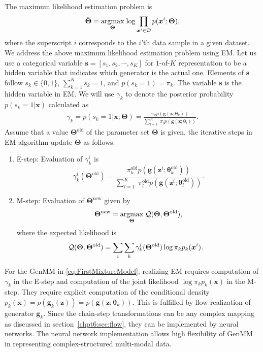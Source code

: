 The maximum likelihood estimation problem is
\begin{equation}\label{eq:max-genmm}
  \hat{\bm{\Theta}} = \underset{\bm{\Theta}}{\operatorname{argmax}}\;{\log{\prod_{\bm{x}^{i} \in \mathcal{D}} p(\bm{x}^{i};\bm{\Theta})}},
\end{equation}
where the superscript $i$ corresponds to the $i$'th data sample in a given dataset.
We address the above maximum likelihood estimation problem using EM. 
Let us use a categorical variable $\bm{s} = [s_1, s_2, \cdots, s_K]$
for $1$-of-$K$ representation to be a hidden variable that indicates which generator is the actual one. Elements of $\bm{s}$ follow $s_k \in \{0,1\}$, $\sum_{k=1}^K s_k =1$, and $p(s_k=1)=\pi_k$. The variable $\bm{s}$ is the hidden variable in EM. We will use $\gamma_k$ to denote the posterior probability $p(s_k =1|\bm{x})$ calculated as
\begin{align}\label{eq-genmm-gamma-org}
  \gamma_k = p(s_k =1|\bm{x};\bm{\Theta}) 
  = \frac{\pi_k p(\bm{g}(\bm{z};\bm{\theta}_k))}{\sum_{l=1}^K\; \pi_l p(\bm{g}(\bm{z};\bm{\theta}_l))}.
\end{align}
Assume that a value $\bm{\Theta}^{\mathrm{old}}$ of the parameter set $\bm{\Theta}$ is given, the iterative steps in EM algorithm update $\bm{\Theta}$ as follows.
\begin{enumerate}
\item E-step: Evaluation of $\gamma_{k}^{i}$ is 
  \begin{equation}\label{eq-genmm-e-step}
    \gamma_{k}^{i}(\bm{\Theta}^{\mathrm{old}}) = \frac{\pi_k^\mathrm{{old}} p(\bm{g}(\bm{z}^{i};\bm{\theta}_k^{\mathrm{old}}))}{\sum_{l=1}^K\; \pi_l^\mathrm{{old}} p(\bm{g}(\bm{z}^{i};\bm{\theta}_l^{\mathrm{old}}))}.   
  \end{equation}
\item M-step: Evaluation of $\bm{\Theta}^{\mathrm{new}}$ given by
  \begin{equation}\label{eq-genmm-opt}
    \bm{\Theta}^{\mathrm{new}} =   \underset{\bm{\Theta}}{\operatorname{argmax}}\;{\mathcal{Q} (\bm{\Theta},\bm{\Theta}^{\mathrm{old}})}, 
  \end{equation}
  where the expected likelihood is
  \begin{equation}
    \hspace{-8pt}\mathcal{Q} (\bm{\Theta},\bm{\Theta}^{\mathrm{old}}) = \sum_{i}\sum_{k} \gamma_{k}^{i}(\bm{\Theta}^{\mathrm{old}}) \log \pi_k p_k(\bm{x}^{i}).
  \end{equation}
\end{enumerate}

For the GenMM in \eqref{eq:FirstMixtureModel}, realizing EM requires computation of $\gamma_k$ in the E-step and computation of the joint likelihood $\log{\pi_k p_k(\bm{x})}$ in the M-step. They require explicit computation of the conditional density $p_k(\bm{x}) =  p(\bm{g}_k(\bm{z})) =p(\bm{g}(\bm{z};\bm{\theta}_k))$. This is fulfilled by flow realization of generator $\bm{g}_k$. Since the chain-step transformations can be any complex mapping as discussed in section~\ref{chpt6:sec:flow}, they can be implemented by neural networks. The neural network implementation allows high flexibility of GenMM in representing complex-structured multi-modal data.


